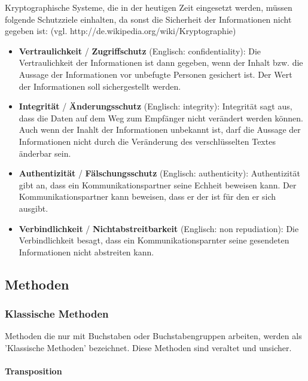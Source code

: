 \documentclass[12pt,a4paper]{report}
\begin{document}
Kryptographische Systeme, die in der heutigen Zeit eingesetzt werden, müssen folgende Schutzziele einhalten, da sonst die Sicherheit der Informationen nicht gegeben ist: (vgl. http://de.wikipedia.org/wiki/Kryptographie)

\begin{itemize}

\item \textbf{Vertraulichkeit} / \textbf{Zugriffschutz} (Englisch: confidentiality): Die Vertraulichkeit der Informationen ist dann gegeben, wenn der Inhalt bzw. die Aussage der Informationen vor unbefugte Personen gesichert ist. Der Wert der Informationen soll sichergestellt werden.

\item \textbf{Integrität} / \textbf{Änderungsschutz}  (Englisch: integrity): Integrität sagt aus, dass die Daten auf dem Weg zum Empfänger nicht verändert werden können. Auch wenn der Inahlt der Informationen unbekannt ist, darf die Aussage der Informationen nicht durch die Veränderung des verschlüsselten Textes änderbar sein.

\item \textbf{Authentizität} / \textbf{Fälschungsschutz} (Englisch: authenticity): Authentizität gibt an, dass ein Kommunikationspartner seine Echheit beweisen kann. Der Kommunikationspartner kann beweisen, dass er der ist für den er sich ausgibt.

\item \textbf{Verbindlichkeit} / \textbf{Nichtabstreitbarkeit} (Englisch: non repudiation): Die Verbindlichkeit besagt, dass ein Kommunikationsparnter seine gesendeten Informationen nicht abstreiten kann.
\end{itemize}

\subsection{Methoden}

\subsubsection{Klassische Methoden}

Methoden die nur mit Buchstaben oder Buchstabengruppen arbeiten, werden als 'Klassische Methoden' bezeichnet. Diese Methoden sind veraltet und unsicher.

\paragraph{Transposition}
\end{document}
